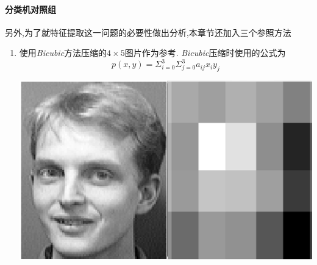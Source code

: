 \paragraph{分类机对照组} 另外,为了就特征提取这一问题的必要性做出分析,本章节还加入三个参照方法\begin{enumerate} 
\label{par:bicubic}
	\item 使用\textit{Bicubic}方法压缩的$4 \times 5$图片作为参考. \textit{Bicubic}压缩时使用的公式为
$$ p(x,y) = \Sigma_{i=0}^3\Sigma_{j=0}^3 a_{ij} x_i y_j $$

		\begin{center}
	\begin{minipage}[t]{\linewidth}
	\center
	{
	\includegraphics[width=\MyFactor\textwidth]{Img/peo_resize2} 
	}
	\end{minipage}
	\medskip
	\end{center}
	

\end{enumerate}
